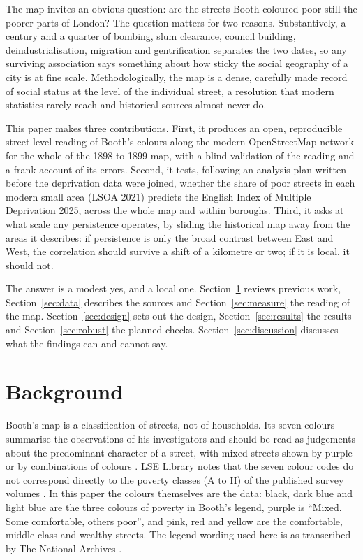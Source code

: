 \documentclass[11pt,a4paper]{article}
\begin{document}
The map invites an obvious question: are the streets Booth coloured poor still the poorer parts of London? The question matters for two reasons. Substantively, a century and a quarter of bombing, slum clearance, council building, deindustrialisation, migration and gentrification separates the two dates, so any surviving association says something about how sticky the social geography of a city is at fine scale. Methodologically, the map is a dense, carefully made record of social status at the level of the individual street, a resolution that modern statistics rarely reach and historical sources almost never do.

This paper makes three contributions. First, it produces an open, reproducible street-level reading of Booth's colours along the modern OpenStreetMap network for the whole of the 1898 to 1899 map, with a blind validation of the reading and a frank account of its errors. Second, it tests, following an analysis plan written before the deprivation data were joined, whether the share of poor streets in each modern small area (LSOA 2021) predicts the English Index of Multiple Deprivation 2025, across the whole map and within boroughs. Third, it asks at what scale any persistence operates, by sliding the historical map away from the areas it describes: if persistence is only the broad contrast between East and West, the correlation should survive a shift of a kilometre or two; if it is local, it should not.

The answer is a modest yes, and a local one. Section~\ref{sec:background} reviews previous work, Section~\ref{sec:data} describes the sources and Section~\ref{sec:measure} the reading of the map. Section~\ref{sec:design} sets out the design, Section~\ref{sec:results} the results and Section~\ref{sec:robust} the planned checks. Section~\ref{sec:discussion} discusses what the findings can and cannot say.

\section{Background}\label{sec:background}

Booth's map is a classification of streets, not of households. Its seven colours summarise the observations of his investigators and should be read as judgements about the predominant character of a street, with mixed streets shown by purple or by combinations of colours \citep{lse_maps}. LSE Library notes that the seven colour codes do not correspond directly to the poverty classes (A to H) of the published survey volumes \citep{lse_maps}. In this paper the colours themselves are the data: black, dark blue and light blue are the three colours of poverty in Booth's legend, purple is ``Mixed. Some comfortable, others poor'', and pink, red and yellow are the comfortable, middle-class and wealthy streets. The legend wording used here is as transcribed by The National Archives \citep{tna}.
\end{document}
